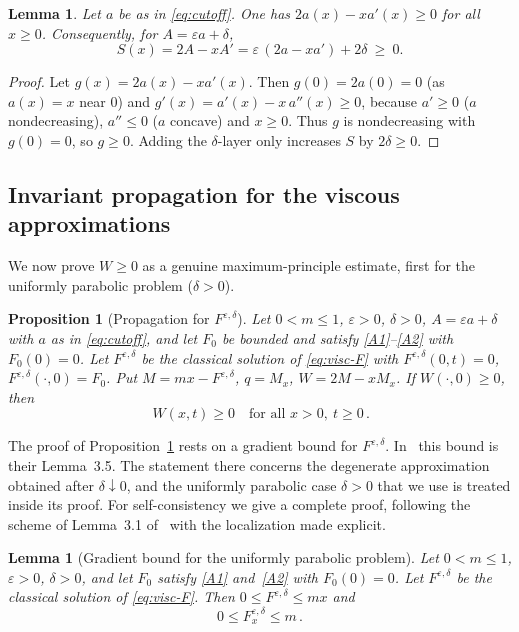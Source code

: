 \documentclass[12pt]{amsart}
\numberwithin{equation}{section}
\theoremstyle{plain}
\newtheorem{proposition}[theorem]{Proposition}
\newtheorem{lemma}[theorem]{Lemma}
\theoremstyle{definition}
\newcommand{\eps}{\varepsilon}
\begin{document}
\begin{lemma}
	\label{lem:cutoff}
	Let $a$ be as in \eqref{eq:cutoff}.
	One has $2a(x)-xa'(x)\ge0$ for all $x\ge0$.
	Consequently, for $A=\eps a+\delta$,
	\[
		S(x)=2A-xA'=\eps\,(2a-xa')+2\delta\ \ge\ 0 .
	\]
\end{lemma}

\begin{proof}
	Let $g(x)=2a(x)-xa'(x)$. Then $g(0)=2a(0)=0$ (as $a(x)=x$ near $0$) and
	$g'(x)=a'(x)-x\,a''(x)\ge0$, because $a'\ge0$ ($a$ nondecreasing), $a''\le0$
	($a$ concave) and $x\ge0$. Thus $g$ is nondecreasing with $g(0)=0$,
	so $g\ge0$.
	Adding the $\delta$-layer only increases $S$ by $2\delta\ge0$.
\end{proof}

\subsection{Invariant propagation for the viscous approximations}

We now prove $W\ge0$ as a genuine maximum-principle estimate, first for the
uniformly parabolic problem ($\delta>0$).

\begin{proposition}[Propagation for $F^{\eps,\delta}$]\label{prop:visc-prop}
	Let $0<m\le1$, $\eps>0$, $\delta>0$, $A=\eps a+\delta$ with $a$ as in
	\eqref{eq:cutoff}, and let $F_0$ be bounded and satisfy \ref{A1}--\ref{A2}
	with $F_0(0)=0$. Let $F^{\eps,\delta}$ be the
	classical solution of
	\eqref{eq:visc-F} with $F^{\eps,\delta}(0,t)=0$,
	$F^{\eps,\delta}(\cdot,0)=F_0$.
	Put $M=mx-F^{\eps,\delta}$, $q=M_x$, $W=2M-xM_x$. If $W(\cdot,0)\ge0$, then
	\[
		\,W(x,t)\ge0\quad\text{for all }x>0,\ t\ge0 \,.
	\]
\end{proposition}

The proof of Proposition~\ref{prop:visc-prop} rests on a gradient bound for
$F^{\eps,\delta}$. In~\cite{TV} this bound is their Lemma~3.5. The statement
there concerns the degenerate approximation obtained after $\delta\downarrow0$,
and the uniformly parabolic case $\delta>0$ that we use is treated inside its
proof. For self-consistency we give a complete proof, following the scheme of
Lemma~3.1 of~\cite{TV} with the localization made explicit.

\begin{lemma}[Gradient bound for the uniformly parabolic
		problem]\label{lem:Fxbound}
	Let $0<m\le1$, $\eps>0$, $\delta>0$, and let $F_0$ satisfy \ref{A1}
	and~\ref{A2} with $F_0(0)=0$. Let $F^{\eps,\delta}$ be the classical
	solution of \eqref{eq:visc-F}.
	Then $0\le F^{\eps,\delta}\le mx$ and
	\begin{equation}\label{eq:Fxbound}
		0\le F^{\eps,\delta}_x\le m \,.
	\end{equation}
\end{lemma}
\end{document}
